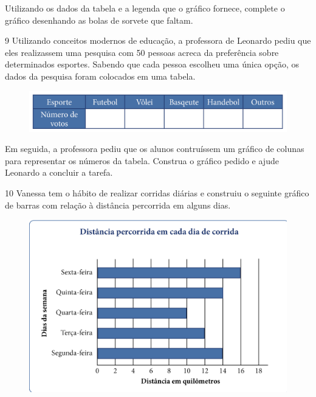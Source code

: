 Utilizando os dados da tabela e a legenda que o gráfico fornece,
complete o gráfico desenhando as bolas de sorvete que faltam.


\pagebreak
\num{9} Utilizando conceitos modernos de educação, a professora de Leonardo
pediu que eles realizassem uma pesquisa com 50 pessoas acreca da
preferência sobre determinados esportes. Sabendo que cada pessoa
escolheu uma única opção, os dados da pesquisa foram colocados em uma tabela.

\begin{figure}[htpb!]
\includegraphics[width=\textwidth]{../ilustracoes/MAT5/SAEB_5ANO_MAT_figura62.png}
\end{figure}

Em seguida, a professora pediu que os alunos contruíssem um gráfico de
colunas para representar os números da tabela. Construa o gráfico pedido
e ajude Leonardo a concluir a tarefa.

\begin{mdframed}[linewidth=2pt,linecolor=salmao]
\vspace{13cm}
\end{mdframed}

\pagebreak

\num{10} Vanessa tem o hábito de realizar corridas diárias e construiu o
seguinte gráfico de barras com relação à distância percorrida em alguns dias.

\begin{figure}[htpb!]
\centering
\includegraphics[width=\textwidth]{../ilustracoes/MAT5/SAEB_5ANO_MAT_figura63.png}
\end{figure}

